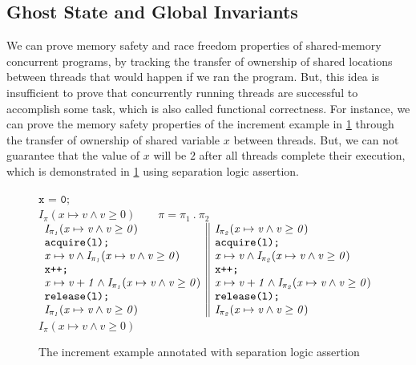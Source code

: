 \documentclass[acmsmall,screen]{acmart}\settopmatter{printfolios=true}
\begin{document}
\subsection{Ghost State and Global Invariants}
We can prove memory safety and race freedom properties of shared-memory concurrent programs, by tracking the transfer of ownership of shared locations between threads that would happen if we ran the program. But, this idea is insufficient to prove that concurrently running threads are successful to accomplish some task, which is also called functional correctness. For instance, we can prove the memory safety properties of the increment example in  \ref{figure1} through the transfer of ownership of shared variable $x$ between threads. But, we can not guarantee that the value of $x$ will be $2$ after all threads complete their execution, which is demonstrated in \ref{figure1} using separation logic assertion.   
\begin{figure}[htb]
\centering
$\texttt{x = 0;}$\\
$\mathit{I_{\pi}(x \mapsto v \land v \geq 0)}\qquad\pi = \pi_1\ .\ \pi_2$\\
$\begin{array}{l || l}
\mathit{I_{\pi_1}(x \mapsto v \land v \geq 0)} & \mathit{I_{\pi_2}(x \mapsto v \land v \geq 0)}\\
\texttt{acquire(l);} & \texttt{acquire(l);}\\
\mathit{x \mapsto v \land I_{\pi_1}(x \mapsto v \land v \geq 0)} & \mathit{x \mapsto v \land I_{\pi_2}(x \mapsto v \land v \geq 0)}\\
\texttt{x++;} & \texttt{x++;}\\
\mathit{x \mapsto v+1 \land I_{\pi_1}(x \mapsto v \land v \geq 0)} & \mathit{x \mapsto v+1 \land I_{\pi_2}(x \mapsto v \land v \geq 0)}\\
\texttt{release(l);} & \texttt{release(l);}\\
\mathit{I_{\pi_1}(x \mapsto v \land v \geq 0)} & \mathit{I_{\pi_2}(x \mapsto v \land v \geq 0)}\\
\end{array}$\\
$\mathit{I_{\pi}(x \mapsto v \land v \geq 0)}$
\caption{The increment example annotated with separation logic assertion}
\label{figure1}
\end{figure}
\end{document}
